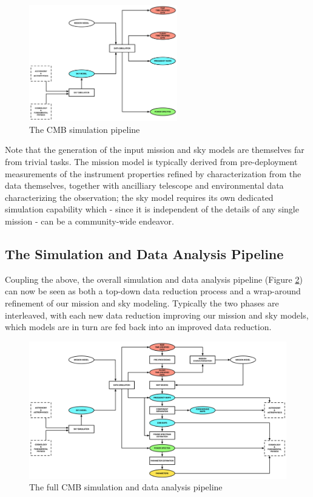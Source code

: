 \begin{figure}[htbp]
\centering
\includegraphics[width=0.575\textwidth]{Analysis/sim}
\caption{The CMB simulation pipeline}
\label{fig_sim}
\end{figure}

Note that the generation of the input mission and sky models are themselves far from trivial tasks. The mission model is typically derived from pre-deployment measurements of the instrument properties refined by characterization from the data themselves, together with ancilliary telescope and environmental data characterizing the observation; the sky model requires its own dedicated simulation capability which - since it is independent of the details of any single mission - can be a community-wide endeavor.

\subsection{The Simulation and Data Analysis Pipeline}

Coupling the above, the overall simulation and data analysis pipeline (Figure \ref{fig_simda}) can now be seen as both a top-down data reduction process and a wrap-around refinement of our mission and sky modeling. Typically the two phases are interleaved, with each new data reduction improving our mission and sky models, which models are in turn are fed back into an improved data reduction.

\begin{figure}[htbp]
\includegraphics[width=1\textwidth]{Analysis/simda}
\caption{The full CMB simulation and data analysis pipeline}
\label{fig_simda}
\end{figure}

